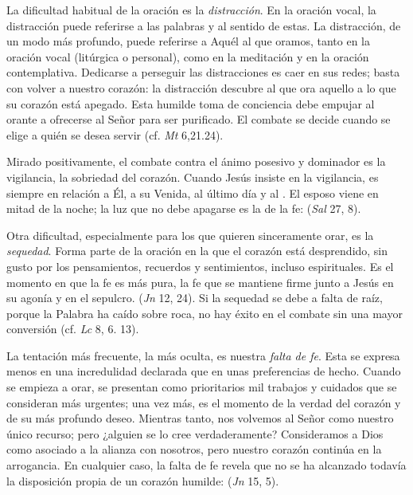 


\begin{ccebody}
	
	 La dificultad habitual de la oración es la \emph{distracción}. En la oración vocal, la distracción puede referirse a las palabras y al sentido de estas. La distracción, de un modo más profundo, puede referirse a Aquél al que oramos, tanto en la oración vocal (litúrgica o personal), como en la meditación y en la oración contemplativa. Dedicarse a perseguir las distracciones es caer en sus redes; basta con volver a nuestro corazón: la distracción descubre al que ora aquello a lo que su corazón está apegado. Esta humilde toma de conciencia debe empujar al orante a ofrecerse al Señor para ser purificado. El combate se decide cuando se elige a quién se desea servir (cf. \emph{Mt} 6,21.24).

	 Mirado positivamente, el combate contra el ánimo posesivo y dominador es la vigilancia, la sobriedad del corazón. Cuando Jesús insiste en la vigilancia, es siempre en relación a Él, a su Venida, al último día y al . El esposo viene en mitad de la noche; la luz que no debe apagarse es la de la fe:  (\emph{Sal} 27, 8).

	 Otra dificultad, especialmente para los que quieren sinceramente orar, es la \emph{sequedad}. Forma parte de la oración en la que el corazón está desprendido, sin gusto por los pensamientos, recuerdos y sentimientos, incluso espirituales. Es el momento en que la fe es más pura, la fe que se mantiene firme junto a Jesús en su agonía y en el sepulcro.  (\emph{Jn} 12, 24). Si la sequedad se debe a falta de raíz, porque la Palabra ha caído sobre roca, no hay éxito en el combate sin una mayor conversión (cf. \emph{Lc} 8, 6. 13).


	 La tentación más frecuente, la más oculta, es nuestra \emph{falta de fe}. Esta se expresa menos en una incredulidad declarada que en unas preferencias de hecho. Cuando se empieza a orar, se presentan como prioritarios mil trabajos y cuidados que se consideran más urgentes; una vez más, es el momento de la verdad del corazón y de su más profundo deseo. Mientras tanto, nos volvemos al Señor como nuestro único recurso; pero ¿alguien se lo cree verdaderamente? Consideramos a Dios como asociado a la alianza con nosotros, pero nuestro corazón continúa en la arrogancia. En cualquier caso, la falta de fe revela que no se ha alcanzado todavía la disposición propia de un corazón humilde:  (\emph{Jn} 15, 5).


\end{ccebody}
